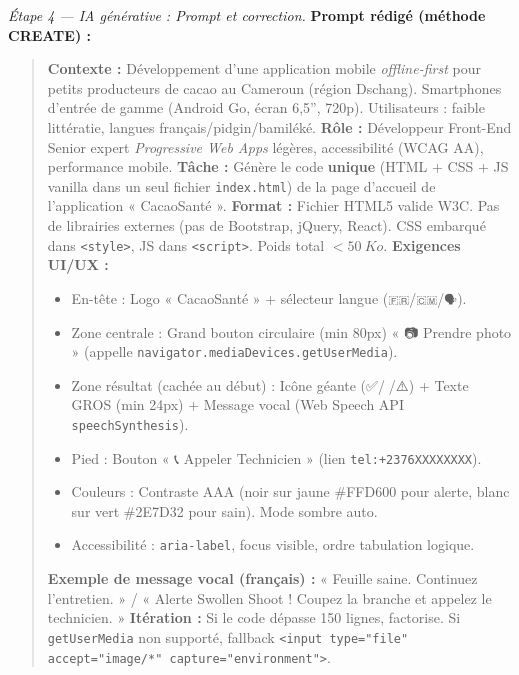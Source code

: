 \documentclass[11pt]{article}
\begin{document}
\begin{exoresolu}
\emph{Étape 4 — IA générative : Prompt et correction.}
\textbf{Prompt rédigé (méthode CREATE) :}
\begin{quote}
\textbf{Contexte :} Développement d'une application mobile \emph{offline-first} pour petits producteurs de cacao au Cameroun (région Dschang). Smartphones d'entrée de gamme (Android Go, écran 6,5'', 720p). Utilisateurs : faible littératie, langues français/pidgin/bamiléké.
\textbf{Rôle :} Développeur Front-End Senior expert \emph{Progressive Web Apps} légères, accessibilité (WCAG AA), performance mobile.
\textbf{Tâche :} Génère le code \textbf{unique} (HTML + CSS + JS vanilla dans un seul fichier \texttt{index.html}) de la page d'accueil de l'application « CacaoSanté ».
\textbf{Format :} Fichier HTML5 valide W3C. Pas de librairies externes (pas de Bootstrap, jQuery, React). CSS embarqué dans \texttt{<style>}, JS dans \texttt{<script>}. Poids total $< \SI{50}{Ko}$.
\textbf{Exigences UI/UX :}
\begin{itemize}
    \item En-tête : Logo « CacaoSanté » + sélecteur langue (\texttt{\texttt{🇫🇷}}/\texttt{\texttt{🇨🇲}}/\texttt{\texttt{🗣️}}).
    \item Zone centrale : Grand bouton circulaire (min 80px) « 📷 Prendre photo » (appelle \texttt{navigator.mediaDevices.getUserMedia}).
    \item Zone résultat (cachée au début) : Icône géante (✅/🚨/⚠️) + Texte GROS (min 24px) + Message vocal (Web Speech API \texttt{speechSynthesis}).
    \item Pied : Bouton « 📞 Appeler Technicien » (lien \texttt{tel:+2376XXXXXXXX}).
    \item Couleurs : Contraste AAA (noir sur jaune \#FFD600 pour alerte, blanc sur vert \#2E7D32 pour sain). Mode sombre auto.
    \item Accessibilité : \texttt{aria-label}, focus visible, ordre tabulation logique.
\end{itemize}
\textbf{Exemple de message vocal (français) :} « Feuille saine. Continuez l'entretien. » / « Alerte Swollen Shoot ! Coupez la branche et appelez le technicien. »
\textbf{Itération :} Si le code dépasse 150 lignes, factorise. Si \texttt{getUserMedia} non supporté, fallback \texttt{<input type="file" accept="image/*" capture="environment">}.
\end{quote}


\end{exoresolu}
\end{document}
